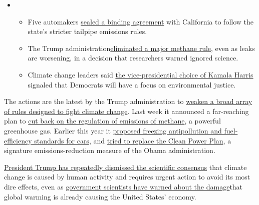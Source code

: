 \begin{itemize}
\item
  \begin{itemize}
  \tightlist
  \item
    Five automakers
    \href{https://www.nytimes3xbfgragh.onion/2020/08/17/climate/california-automakers-pollution.html?action=click\&pgtype=Article\&state=default\&region=MAIN_CONTENT_1\&context=storylines_keepup}{sealed
    a binding agreement} with California to follow the state's stricter
    tailpipe emissions rules.
  \item
    The Trump
    administration\href{https://www.nytimes3xbfgragh.onion/2020/08/13/climate/trump-methane.html?action=click\&pgtype=Article\&state=default\&region=MAIN_CONTENT_1\&context=storylines_keepup}{eliminated
    a major methane rule}, even as leaks are worsening, in a decision
    that researchers warned ignored science.
  \item
    Climate change leaders said
    \href{https://www.nytimes3xbfgragh.onion/2020/08/12/climate/kamala-harris-environmental-justice.html?action=click\&pgtype=Article\&state=default\&region=MAIN_CONTENT_1\&context=storylines_keepup}{the
    vice-presidential choice of Kamala Harris} signaled that Democrats
    will have a focus on environmental justice.
  \end{itemize}
\end{itemize}

The actions are the latest by the Trump administration to
\href{https://www.nytimes3xbfgragh.onion/2019/08/29/climate/climate-rule-trump-reversing.html}{weaken
a broad array of rules designed to fight climate change}. Last week it
announced a far-reaching plan to
\href{https://www.nytimes3xbfgragh.onion/2019/08/29/climate/epa-methane-greenhouse-gas.html}{cut
back on the regulation of emissions of methane}, a powerful greenhouse
gas. Earlier this year it
\href{https://www.nytimes3xbfgragh.onion/2018/08/02/climate/trump-auto-emissions-california.html?module=inline}{proposed
freezing antipollution and fuel-efficiency standards for cars}, and
\href{https://www.nytimes3xbfgragh.onion/2019/06/19/climate/epa-coal-emissions.html?module=inline}{tried
to replace the Clean Power Plan}, a signature emissions-reduction
measure of the Obama administration.

\href{https://www.nytimes3xbfgragh.onion/interactive/2019/climate/winter-cold-weather.html}{President
Trump has repeatedly dismissed the scientific consensus} that climate
change is caused by human activity and requires urgent action to avoid
its most dire effects, even as
\href{https://www.nytimes3xbfgragh.onion/2018/11/23/climate/us-climate-report.html}{government
scientists have warned about the damage}that global warming is already
causing the United States' economy.

